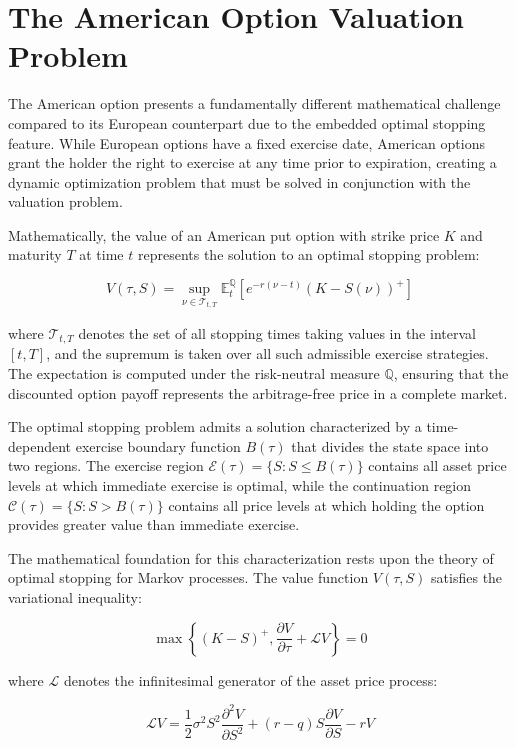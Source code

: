 \documentclass[
  american,
  11pt,
  11pt,
  letterpaper,
  onecolumn]{article}
\begin{document}
\section{The American Option Valuation
Problem}\label{the-american-option-valuation-problem}

The American option presents a fundamentally different mathematical
challenge compared to its European counterpart due to the embedded
optimal stopping feature. While European options have a fixed exercise
date, American options grant the holder the right to exercise at any
time prior to expiration, creating a dynamic optimization problem that
must be solved in conjunction with the valuation problem.

Mathematically, the value of an American put option with strike price
\(K\) and maturity \(T\) at time \(t\) represents the solution to an
optimal stopping problem:

\[V(\tau, S) = \sup_{\nu \in \mathcal{T}_{t,T}} \mathbb{E}_t^\mathbb{Q} \left[ e^{-r(\nu - t)} (K - S(\nu))^+ \right]\]

where \(\mathcal{T}_{t,T}\) denotes the set of all stopping times taking
values in the interval \([t,T]\), and the supremum is taken over all
such admissible exercise strategies. The expectation is computed under
the risk-neutral measure \(\mathbb{Q}\), ensuring that the discounted
option payoff represents the arbitrage-free price in a complete market.

The optimal stopping problem admits a solution characterized by a
time-dependent exercise boundary function \(B(\tau)\) that divides the
state space into two regions. The exercise region
\(\mathcal{E}(\tau) = \{S : S \leq B(\tau)\}\) contains all asset price
levels at which immediate exercise is optimal, while the continuation
region \(\mathcal{C}(\tau) = \{S : S > B(\tau)\}\) contains all price
levels at which holding the option provides greater value than immediate
exercise.

The mathematical foundation for this characterization rests upon the
theory of optimal stopping for Markov processes. The value function
\(V(\tau, S)\) satisfies the variational inequality:

\[\max\left\{(K-S)^+, \frac{\partial V}{\partial \tau} + \mathcal{L}V\right\} = 0\]

where \(\mathcal{L}\) denotes the infinitesimal generator of the asset
price process:

\[\mathcal{L}V = \frac{1}{2}\sigma^2 S^2 \frac{\partial^2 V}{\partial S^2} + (r-q)S\frac{\partial V}{\partial S} - rV\]
\end{document}
